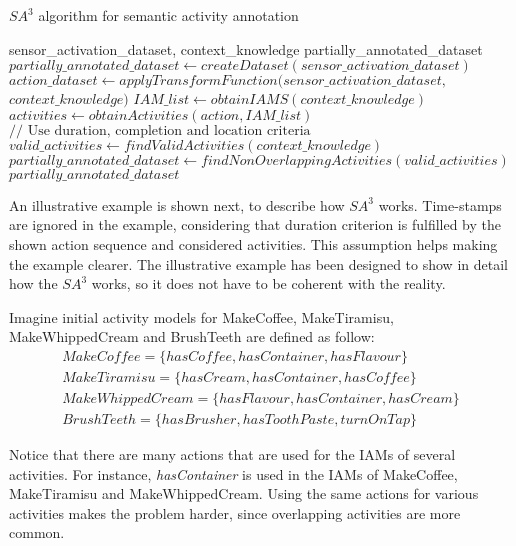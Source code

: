 \begin{algorithm}
 \caption{$SA^3$ algorithm for semantic activity annotation}
 \label{alg:sa3}
 \begin{algorithmic}
 \REQUIRE sensor\_activation\_dataset, context\_knowledge
 \ENSURE partially\_annotated\_dataset
 \STATE $partially\_annotated\_dataset \leftarrow createDataset(sensor\_activation\_dataset)$
 \STATE $action\_dataset \leftarrow applyTransformFunction(sensor\_activation\_dataset,$ 
 $context\_knowledge)$
 \STATE $IAM\_list \leftarrow obtainIAMS(context\_knowledge)$
    \STATE $activities \leftarrow obtainActivities(action, IAM\_list)$
  \ENDIF
    \STATE $// \text{ Use duration, completion and location criteria}$
    \STATE $valid\_activities \leftarrow findValidActivities(context\_knowledge)$
  \ENDFOR
 \ENDFOR
 \STATE $partially\_annotated\_dataset \leftarrow findNonOverlappingActivities(valid\_activities)$
 \RETURN $partially\_annotated\_dataset$
 \end{algorithmic}
\end{algorithm}

An illustrative example is shown next, to describe how $SA^3$ works. Time-stamps are ignored in the example, considering that duration criterion is fulfilled by the shown action sequence and considered activities. This assumption helps making the example clearer. The illustrative example has been designed to show in detail how the $SA^3$ works, so it does not have to be coherent with the reality. 

Imagine initial activity models for MakeCoffee, MakeTiramisu, MakeWhippedCream and BrushTeeth are defined as follow:
 \begin{equation*}
  \begin{split}
  MakeCoffee =\{hasCoffee, hasContainer, hasFlavour\} \\
  MakeTiramisu = \{hasCream, hasContainer, hasCoffee\} \\
  MakeWhippedCream = \{hasFlavour, hasContainer, hasCream\} \\
  BrushTeeth = \{hasBrusher, hasToothPaste, turnOnTap\} 
  \end{split}
 \end{equation*} 
 
Notice that there are many actions that are used for the IAMs of several activities. For instance, \textit{hasContainer} is used in the IAMs of MakeCoffee, MakeTiramisu and MakeWhippedCream. Using the same actions for various activities makes the problem harder, since overlapping activities are more common.

